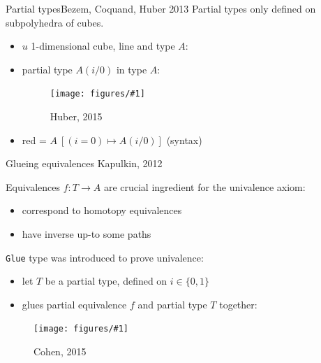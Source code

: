 \documentclass[english, draft]{beamer}
\newcommand{\fig}[2]{
    \begin{figure}\begin{center}\texttt{[image: figures/\#1]}\caption{#2\label{#1}}\end{center}
    \end{figure}}
\begin{document}
\begin{frame}{Partial types}{Bezem, Coquand, Huber 2013}
 Partial types only defined on subpolyhedra of cubes.
 
\begin{itemize}
    \item $u$ 1-dimensional cube, line and type $A$:
    \item partial type $A(i/0)$ in type $A$:
            \fig{types_side}{Huber, 2015}
    \item red = $A\ [(i = 0) \mapsto A(i/0)]$ (syntax)
\end{itemize}

 
 
\end{frame}

\begin{frame}{Glueing equivalences}
    {Kapulkin, 2012}
  
  Equivalences $f : T \rightarrow A$ are crucial ingredient for the univalence axiom:
  \begin{itemize}
   \item correspond to homotopy equivalences
   \item have inverse up-to some paths
  \end{itemize}

  
   \texttt{Glue} type was introduced to prove univalence:
   \begin{itemize}
    \item let \(T\) be a partial type, defined on $i\in \{0,1\}$ 
    \item glues partial equivalence $f$ and partial type $T$ together:
   \end{itemize}

 \fig{glue}{Cohen, 2015}

  
 
\end{frame}
\end{document}

